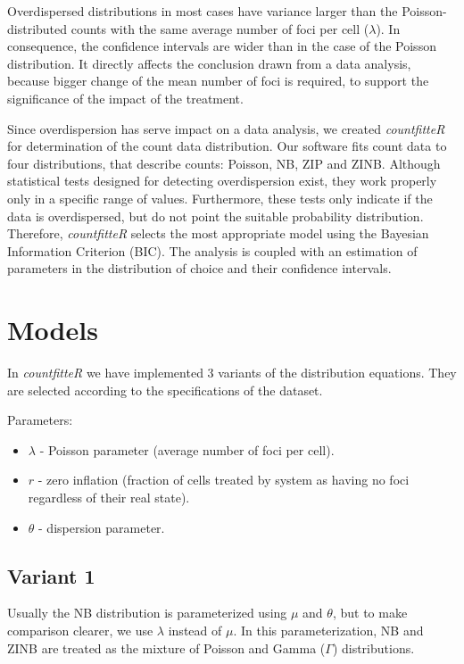 Overdispersed distributions in most cases have variance larger than the Poisson-distributed counts with the same average number of foci per cell ($\lambda$). In consequence, the confidence intervals are wider than in the case of the Poisson distribution. It directly affects the conclusion drawn from a data analysis, because bigger change of the mean number of foci is required, to support the significance of the impact of the treatment. 

Since overdispersion has serve impact on a data analysis, we created \emph{countfitteR} for determination of the count data distribution. Our software fits count data to four distributions, that describe counts: Poisson, NB, ZIP and ZINB. Although statistical tests designed for detecting overdispersion exist, they work properly only in a specific range of values. Furthermore, these tests only indicate if the data is overdispersed, but do not point the suitable probability distribution. Therefore, \emph{countfitteR} selects the most appropriate model using the Bayesian Information Criterion (BIC). The analysis is coupled with an estimation of parameters in the distribution of choice and their confidence intervals.  

\section{Models}

In \emph{countfitteR} we have implemented 3 variants of the distribution equations. They are selected according to the specifications of the dataset. %

Parameters:
\begin{itemize}
\item $\lambda$ - Poisson parameter (average number of foci per cell). 
\item $r$ - zero inflation (fraction of cells treated by system as having no foci regardless of their real state).
\item $\theta$ - dispersion parameter.
\end{itemize}

\subsection{Variant 1}

Usually the NB distribution is parameterized using $\mu$ and $\theta$, but to make comparison clearer, we use $\lambda$ instead of $\mu$. In this parameterization, NB and ZINB are treated as the mixture of Poisson and Gamma ($\Gamma$) distributions.  

